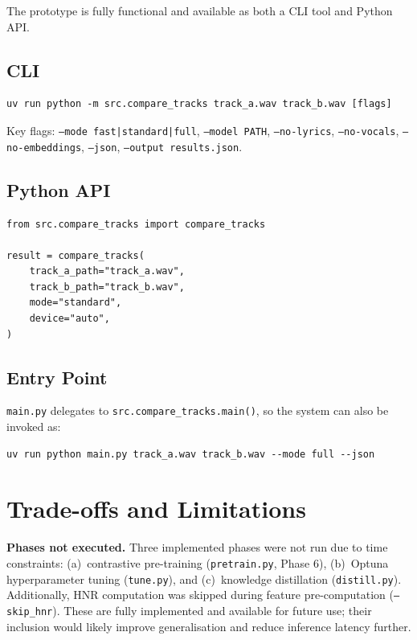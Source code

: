 \documentclass[11pt,a4paper]{article}
\begin{document}
The prototype is fully functional and available as both a CLI tool and Python API.

\subsection{CLI}

\begin{verbatim}
uv run python -m src.compare_tracks track_a.wav track_b.wav [flags]
\end{verbatim}

Key flags: \texttt{--mode fast|standard|full}, \texttt{--model PATH}, \texttt{--no-lyrics}, \texttt{--no-vocals}, \texttt{--no-embeddings}, \texttt{--json}, \texttt{--output results.json}.

\subsection{Python API}

\begin{verbatim}
from src.compare_tracks import compare_tracks

result = compare_tracks(
    track_a_path="track_a.wav",
    track_b_path="track_b.wav",
    mode="standard",
    device="auto",
)
\end{verbatim}

\subsection{Entry Point}

\texttt{main.py} delegates to \texttt{src.compare\_tracks.main()}, so the system can also be invoked as:

\begin{verbatim}
uv run python main.py track_a.wav track_b.wav --mode full --json
\end{verbatim}


\section{Trade-offs and Limitations}

\textbf{Phases not executed.} Three implemented phases were not run due to time constraints: (a)~contrastive pre-training (\texttt{pretrain.py}, Phase 6), (b)~Optuna hyperparameter tuning (\texttt{tune.py}), and (c)~knowledge distillation (\texttt{distill.py}). Additionally, HNR computation was skipped during feature pre-computation (\texttt{--skip\_hnr}). These are fully implemented and available for future use; their inclusion would likely improve generalisation and reduce inference latency further.
\end{document}
